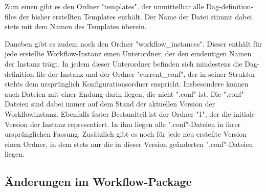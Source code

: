 Zum einen gibt es den Ordner "templates", der unmittelbar alle Dag-definition-files der bisher erstellten Templates enthält. Der Name der Datei stimmt dabei stets mit dem Namen des Templates überein. 

Daneben gibt es zudem noch den Ordner "workflow_instances". Dieser enthält für jede erstellte Workflow-Instanz einen Unterordner, der den eindeutigen Namen der Instanz trägt. In jedem dieser Unterordner befinden sich mindestens die Dag-definition-file der Instanz und der Ordner "current_conf", der in seiner Struktur stehts dem ursprünglich Konfigurationsordner enspricht. Insbesondere können auch Dateien mit einer Endung darin liegen, die nicht ".conf" ist. Die ".conf"-Dateien sind dabei immer auf dem Stand der aktuellen Version der Workflowinstanz. Ebenfalls fester Bestandteil ist der Ordner "1", der die initiale Version der Instanz representiert. In ihm liegen alle ".conf"-Dateien in ihrer ursprünglichen Fassung. Zusätzlich gibt es noch für jede neu erstellte Version einen Ordner, in dem stets nur die in dieser Version geänderten ".conf"-Dateien liegen.

\subsection{Änderungen im Workflow-Package}
